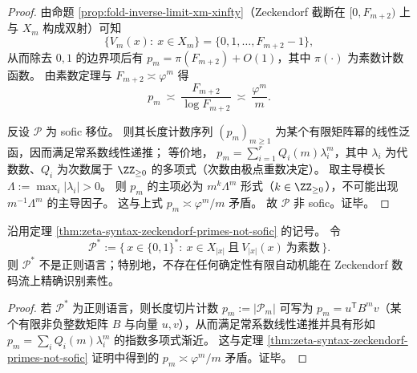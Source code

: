 \begin{proof}
由命题 \ref{prop:fold-inverse-limit-xm-xinfty}（Zeckendorf 截断在 \([0,F_{m+2})\) 上与 \(X_m\) 构成双射）可知
\[
\{V_m(x):\ x\in X_m\}=\{0,1,\dots,F_{m+2}-1\},
\]
从而除去 \(0,1\) 的边界项后有
\(
p_m=\pi(F_{m+2})+O(1)
\)，其中 \(\pi(\cdot)\) 为素数计数函数。
由素数定理与 \(F_{m+2}\asymp \varphi^m\) 得
\[
p_m\ \asymp\ \frac{F_{m+2}}{\log F_{m+2}}
\ \asymp\ \frac{\varphi^m}{m}.
\]
\par
反设 \(\mathcal P\) 为 sofic 移位。
则其长度计数序列 \((p_m)_{m\ge 1}\) 为某个有限矩阵幂的线性泛函，因而满足常系数线性递推；
等价地，
\(
p_m=\sum_{i=1}^r Q_i(m)\lambda_i^m
\)，其中 \(\lambda_i\) 为代数数、\(Q_i\) 为次数属于 \(\ZZ_{\ge 0}\) 的多项式（次数由极点重数决定）。
取主导模长 \(\Lambda:=\max_i|\lambda_i|>0\)。
则 \(p_m\) 的主项必为 \(m^k\Lambda^m\) 形式（\(k\in\ZZ_{\ge 0}\)），不可能出现 \(m^{-1}\Lambda^m\) 的主导因子。
这与上式 \(p_m\asymp \varphi^m/m\) 矛盾。
故 \(\mathcal P\) 非 sofic。证毕。
\end{proof}

\begin{corollary}\label{cor:zeta-syntax-zeckendorf-primes-not-regular}
沿用定理 \ref{thm:zeta-syntax-zeckendorf-primes-not-sofic} 的记号。
令
\[
\mathcal P^{\ast}:=\{\,x\in\{0,1\}^{\ast}:\ x\in X_{|x|}\ \text{且}\ V_{|x|}(x)\ \text{为素数}\,\}.
\]
则 \(\mathcal P^{\ast}\) 不是正则语言；特别地，不存在任何确定性有限自动机能在 Zeckendorf 数码流上精确识别素性。
\end{corollary}
\begin{proof}
若 \(\mathcal P^{\ast}\) 为正则语言，则长度切片计数 \(p_m:=|\mathcal P_m|\) 可写为 \(p_m=u^{\mathsf T}B^m v\)（某个有限非负整数矩阵 \(B\) 与向量 \(u,v\)），从而满足常系数线性递推并具有形如
\(
p_m=\sum_i Q_i(m)\lambda_i^m
\)
的指数多项式渐近。
这与定理 \ref{thm:zeta-syntax-zeckendorf-primes-not-sofic} 证明中得到的
\(
p_m\asymp \varphi^m/m
\)
矛盾。证毕。
\end{proof}


